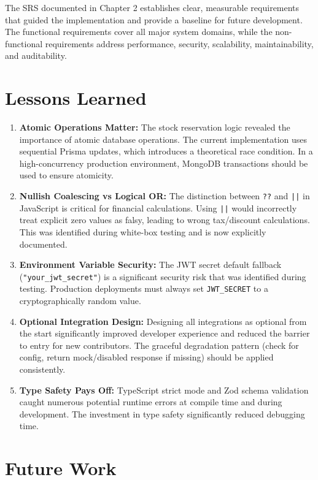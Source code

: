 ﻿\documentclass[12pt,a4paper]{report}
\begin{document}
The SRS documented in Chapter 2 establishes clear, measurable requirements that guided the implementation and provide a baseline for future development. The functional requirements cover all major system domains, while the non-functional requirements address performance, security, scalability, maintainability, and auditability.

\section{Lessons Learned}

\begin{enumerate}[leftmargin=1.5em]
  \item \textbf{Atomic Operations Matter:} The stock reservation logic revealed the importance of atomic database operations. The current implementation uses sequential Prisma updates, which introduces a theoretical race condition. In a high-concurrency production environment, MongoDB transactions should be used to ensure atomicity.
  \item \textbf{Nullish Coalescing vs Logical OR:} The distinction between \texttt{??} and \texttt{||} in JavaScript is critical for financial calculations. Using \texttt{||} would incorrectly treat explicit zero values as falsy, leading to wrong tax/discount calculations. This was identified during white-box testing and is now explicitly documented.
  \item \textbf{Environment Variable Security:} The JWT secret default fallback (\texttt{"your\_jwt\_secret"}) is a significant security risk that was identified during testing. Production deployments must always set \texttt{JWT\_SECRET} to a cryptographically random value.
  \item \textbf{Optional Integration Design:} Designing all integrations as optional from the start significantly improved developer experience and reduced the barrier to entry for new contributors. The graceful degradation pattern (check for config, return mock/disabled response if missing) should be applied consistently.
  \item \textbf{Type Safety Pays Off:} TypeScript strict mode and Zod schema validation caught numerous potential runtime errors at compile time and during development. The investment in type safety significantly reduced debugging time.
\end{enumerate}

\section{Future Work}
\end{document}
